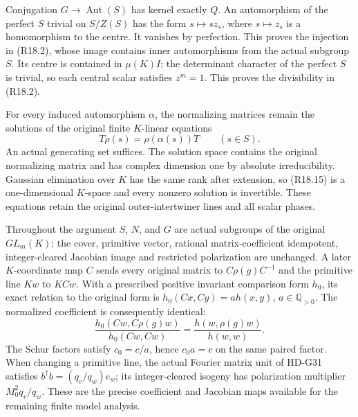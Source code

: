 Conjugation \(G\to\operatorname{Aut}(S)\) has kernel
exactly \(Q\). An automorphism of the perfect \(S\)
trivial on \(S/Z(S)\) has the form \(s\mapsto sz_s\),
where \(s\mapsto z_s\) is a homomorphism to the centre.
It vanishes by perfection. This proves the injection in
(R18.2), whose image contains inner automorphisms from
the actual subgroup \(S\). Its centre is contained in
\(\mu(K)I\); the determinant character of the perfect
\(S\) is trivial, so each central scalar satisfies
\(z^m=1\). This proves the divisibility in (R18.2).

For every induced automorphism \(\alpha\), the normalizing
matrices remain the solutions of the original finite
\(K\)-linear equations
\[
          T\rho(s)=\rho(\alpha(s))T\qquad(s\in S).       \tag{R18.15}
\]
An actual generating set suffices. The solution space
contains the original normalizing matrix and has complex
dimension one by absolute irreducibility. Gaussian
elimination over \(K\) has the same rank after extension,
so (R18.15) is a one-dimensional \(K\)-space and every
nonzero solution is invertible. These equations retain
the original outer-intertwiner lines and all scalar phases.

Throughout the argument \(S\), \(N\), and \(G\) are
actual subgroups of the original \(GL_m(K)\); the cover,
primitive vector, rational matrix-coefficient idempotent,
integer-cleared Jacobian image and restricted polarization
are unchanged. A later \(K\)-coordinate map \(C\) sends
every original matrix to \(C\rho(g)C^{-1}\) and the
primitive line \(Kw\) to \(KCw\). With a prescribed
positive invariant comparison form \(h_0\), its exact
relation to the original form is
\(h_0(Cx,Cy)=a h(x,y)\), \(a\in\mathbb Q_{>0}\).
The normalized coefficient is consequently identical:
\[
 \frac{h_0(Cw,C\rho(g)w)}{h_0(Cw,Cw)}
                 =\frac{h(w,\rho(g)w)}{h(w,w)}.          \tag{R18.16}
\]
The Schur factors satisfy \(c_0=c/a\), hence
\(c_0a=c\) on the same paired factor. When changing a
primitive line, the actual Fourier matrix unit of HD-G31
satisfies \(b^\dagger b=(q_v/q_w)e_w\); its integer-cleared
isogeny has polarization multiplier \(M_0^2q_v/q_w\).
These are the precise coefficient and Jacobian maps available
for the remaining finite model analysis.
